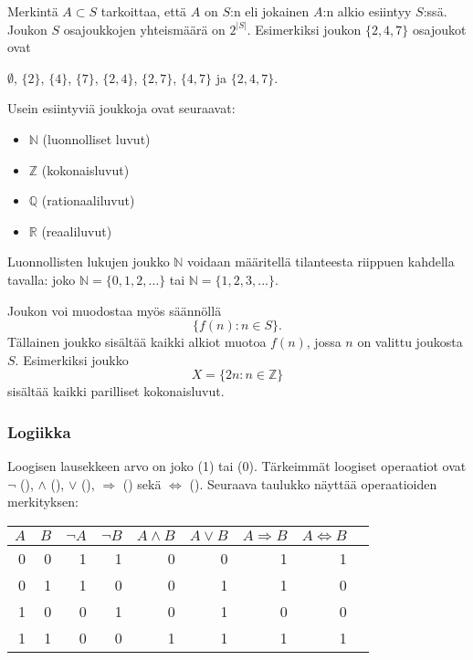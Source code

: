 Merkintä $A \subset S$ tarkoittaa,
että $A$ on $S$:n 
eli jokainen $A$:n alkio esiintyy $S$:ssä.
Joukon $S$ osajoukkojen yhteismäärä on $2^{|S|}$.
Esimerkiksi joukon $\{2,4,7\}$
osajoukot ovat
\begin{center}
$\emptyset$,
$\{2\}$, $\{4\}$, $\{7\}$, $\{2,4\}$, $\{2,7\}$, $\{4,7\}$ ja $\{2,4,7\}$.
\end{center}

Usein esiintyviä joukkoja ovat seuraavat:

\begin{itemize}[noitemsep]
\item $\mathbb{N}$ (luonnolliset luvut)
\item $\mathbb{Z}$ (kokonaisluvut)
\item $\mathbb{Q}$ (rationaaliluvut)
\item $\mathbb{R}$ (reaaliluvut)
\end{itemize}

Luonnollisten lukujen joukko $\mathbb{N}$ voidaan määritellä
tilanteesta riippuen kahdella tavalla:
joko $\mathbb{N}=\{0,1,2,\ldots\}$
tai $\mathbb{N}=\{1,2,3,...\}$.

Joukon voi muodostaa myös säännöllä
\[\{f(n) : n \in S\}.\]
Tällainen joukko sisältää kaikki alkiot
muotoa $f(n)$, jossa $n$ on valittu joukosta $S$.
Esimerkiksi joukko
\[X=\{2n : n \in \mathbb{Z}\}\]
sisältää kaikki parilliset kokonaisluvut.

\subsubsection{Logiikka}


Loogisen lausekkeen arvo on joko  (1) tai
 (0).
Tärkeimmät loogiset operaatiot ovat
$\lnot$ (),
$\land$ (),
$\lor$ (),
$\Rightarrow$ () sekä
$\Leftrightarrow$ ().
Seuraava taulukko näyttää operaatioiden merkityksen:

\begin{center}
\begin{tabular}{rr|rrrrrrr}
$A$ & $B$ & $\lnot A$ & $\lnot B$ & $A \land B$ & $A \lor B$ & $A \Rightarrow B$ & $A \Leftrightarrow B$ \\
\hline
0 & 0 & 1 & 1 & 0 & 0 & 1 & 1 \\
0 & 1 & 1 & 0 & 0 & 1 & 1 & 0 \\
1 & 0 & 0 & 1 & 0 & 1 & 0 & 0 \\
1 & 1 & 0 & 0 & 1 & 1 & 1 & 1 \\
\end{tabular}
\end{center}

